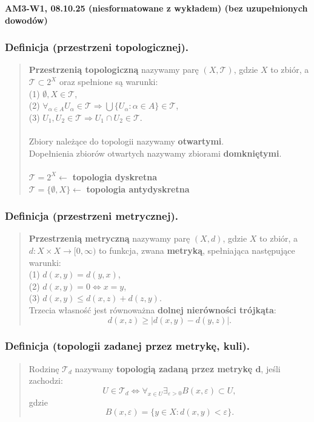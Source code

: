\documentclass[10pt,a4paper]{article}
\newcommand{\zagadnienie}[3]{%
    \clearpage %
    \noindent\textbf{#1} #2\\
    #3
}
\begin{document}
\zagadnienie{AM3-W1, 08.10.25 (niesformatowane z wykładem) (bez uzupełnionych dowodów)}{}
{
    \subsubsection*{Definicja (przestrzeni topologicznej).}
    \begin{quote}
    \textbf{Przestrzenią topologiczną} nazywamy parę $(X, \mathcal{T})$, gdzie $X$ to zbiór, a $\mathcal{T} \subset 2^X$ oraz spełnione są warunki:\\
    (1) $\emptyset, X \in \mathcal{T}$,\\
    (2) $\forall_{\alpha \in A} U_{\alpha} \in \mathcal{T} \Rightarrow \bigcup \{U_{\alpha}: \alpha \in A\} \in \mathcal{T}$,\\
    (3) $U_1, U_2 \in \mathcal{T} \Rightarrow U_1 \cap U_2 \in \mathcal{T}$.\\\\
    Zbiory należące do topologii nazywamy \textbf{otwartymi}. \\
    Dopełnienia zbiorów otwartych nazywamy zbiorami \textbf{domkniętymi}. \\\\
    $\mathcal{T} = 2^X \leftarrow$ \textbf{topologia dyskretna} \\
    $\mathcal{T} = \{\emptyset, X\} \leftarrow$ \textbf{topologia antydyskretna}
    \end{quote}


    \subsubsection*{Definicja (przestrzeni metrycznej).}
    \begin{quote}
    \textbf{Przestrzenią metryczną} nazywamy parę $(X, d)$, gdzie $X$ to zbiór, a $d: X \times X \to [0, \infty)$ to funkcja, zwana \textbf{metryką}, spełniająca następujące warunki:\\
    (1) $d(x, y) = d(y, x)$,\\
    (2) $d(x, y) = 0 \iff x = y$,\\
    (3) $d(x, y) \leq d(x, z) + d(z, y)$.\\
    Trzecia własność jest równoważna \textbf{dolnej nierówności trójkąta}:
    $$
    d(x, z) \geq |d(x, y) - d(y, z)|.
    $$
    \end{quote}

    \subsubsection*{Definicja (topologii zadanej przez metrykę, kuli).}
    \begin{quote}
    Rodzinę $\mathcal{T}_d$ nazywamy \textbf{topologią zadaną przez metrykę $\mathbf{d}$}, jeśli zachodzi:
    $$U \in \mathcal{T}_d \iff \forall_{x \in U} \exists_{\varepsilon > 0} B(x, \varepsilon) \subset U,$$
    gdzie
    $$B(x, \varepsilon) = \{y \in X : d(x, y) < \varepsilon\}.$$
    \end{quote}

}
\end{document}
